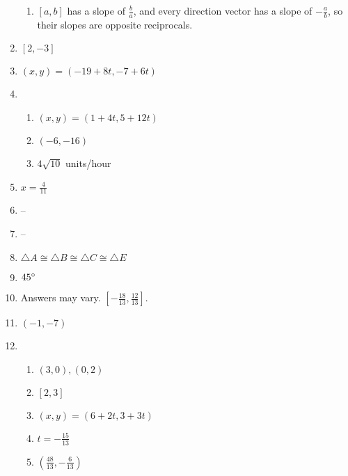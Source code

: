 \documentclass{article}
\begin{document}
\begin{enumerate}
\begin{enumerate}
	\item $[a, b]$ has a slope of $\frac{b}{a}$, and every direction vector has a slope of $-\frac{a}{b}$, so their slopes are opposite reciprocals.
	
	\end{enumerate}
	
\item $[2,-3]$

\item $(x, y) = (-19 + 8t, -7 + 6t)$

\item

	\begin{enumerate}
	
	\item $(x, y) = (1 + 4t, 5 + 12t)$
	
	\item $(-6, -16)$
	
	\item $4\sqrt{10}$ units/hour
	
	\end{enumerate}
	
\item $x = \frac{4}{11}$

\item --

\item --

\item $\triangle A \cong \triangle B \cong \triangle C \cong \triangle E$

\item $45 \degree$

\item Answers may vary. $[-\frac{18}{13}, \frac{12}{13}]$.

\item $(-1, -7)$

\item

	\begin{enumerate}
	
	\item $(3, 0), (0,2)$
	
	\item $[2, 3]$
	
	\item $(x, y) = (6 + 2t, 3 + 3t)$
	
	\item $t = -\frac{15}{13}$
	
	\item $(\frac{48}{13}, -\frac{6}{13})$
	

\end{enumerate}
\end{enumerate}
\end{document}

